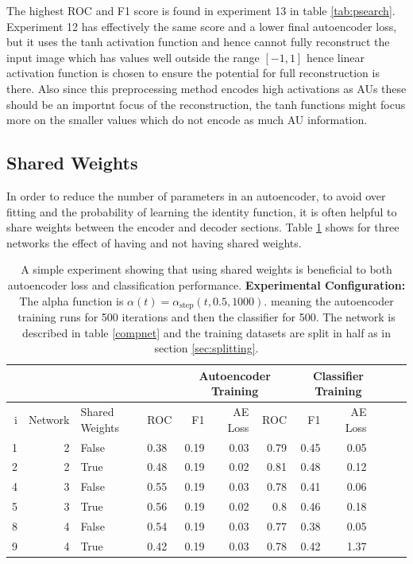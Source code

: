 
      The highest ROC and F1 score is found in experiment 13 in table \ref{tab:psearch}. Experiment 12
      has effectively the same score and a lower final autoencoder loss, but it uses the tanh activation
      function and hence cannot fully reconstruct the input image which has values well outside the
      range $[-1,1]$ hence linear activation function is chosen to ensure the potential for full reconstruction is there.
      Also since this preprocessing method encodes high activations as AUs these should be
      an importnt focus of the reconstruction, the tanh functions might focus more on the smaller values which
      do not encode as much AU information.

    \newpage
    \subsection{Shared Weights}
      In order to reduce the number of parameters in an autoencoder, to avoid over fitting
      and the probability of learning the identity function, it is often helpful to share weights
      between the encoder and decoder sections.
      Table \ref{tab:sharedweights} shows
      for three networks the effect of having and not having shared weights.

      \begin{table}[!h] \centering
      {\footnotesize
      \begin{tabular}{rrllrrrrrrrr}
        &&&&   \multicolumn{3}{|c|}{Autoencoder Training} &  \multicolumn{3}{c|}{Classifier Training}    \\
      \hline
        i & Network               &   Shared Weights &    ROC&F1&AE Loss & ROC & F1 & AE Loss \\
      \hline
       1 & 2    & False     &    0.38 &   0.19 &     0.03 &    0.79 &   0.45 &     0.05 \\
       2 & 2    & True      &    0.48 &   0.19 &     0.02 &    0.81 &   0.48 &     0.12 \\
      \hline
      4 & 3    & False     &    0.55 &   0.19 &     0.03 &    0.78 &   0.41 &     0.06 \\
      5 & 3    & True      &    0.56 &   0.19 &     0.02 &    0.8  &   0.46 &     0.18 \\
      \hline
      8 & 4     & False     &    0.54 &   0.19 &     0.03 &    0.77 &   0.38 &     0.05 \\
      9 & 4     & True      &    0.42 &   0.19 &     0.03 &    0.78 &   0.42 &     1.37 \\
       \hline
     \end{tabular}}\caption{A simple experiment showing that using shared weights is beneficial
     to both autoencoder loss and classification performance. {\bf Experimental Configuration:}
      The alpha function is $\alpha(t)=\alpha_{\text{step}}(t,0.5,1000)$.
      meaning the autoencoder training runs for 500 iterations and then the classifier for 500.
      The network is described in table \ref{compnet} and the training datasets are split in half as in section
      \ref{sec:splitting}.} \label{tab:sharedweights} \end{table}

